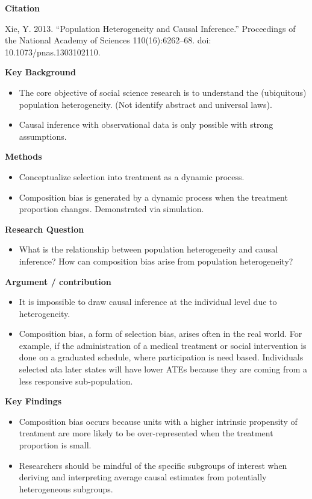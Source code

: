 \documentclass[
]{book}
\providecommand{\tightlist}{%
  \setlength{\itemsep}{0pt}\setlength{\parskip}{0pt}}
\begin{document}
\textbf{Citation}

Xie, Y. 2013. ``Population Heterogeneity and Causal Inference.'' Proceedings of the National Academy of Sciences 110(16):6262--68. doi: 10.1073/pnas.1303102110.

\textbf{Key Background}

\begin{itemize}
\tightlist
\item
  The core objective of social science research is to understand the (ubiquitous) population heterogeneity. (Not identify abstract and universal laws).
\item
  Causal inference with observational data is only possible with strong assumptions.
\end{itemize}

\textbf{Methods}

\begin{itemize}
\tightlist
\item
  Conceptualize selection into treatment as a dynamic process.
\item
  Composition bias is generated by a dynamic process when the treatment proportion changes. Demonstrated via simulation.
\end{itemize}

\textbf{Research Question}

\begin{itemize}
\tightlist
\item
  What is the relationship between population heterogeneity and causal inference? How can composition bias arise from population heterogeneity?
\end{itemize}

\textbf{Argument / contribution}

\begin{itemize}
\tightlist
\item
  It is impossible to draw causal inference at the individual level due to heterogeneity.
\item
  Composition bias, a form of selection bias, arises often in the real world. For example, if the administration of a medical treatment or social intervention is done on a graduated schedule, where participation is need based. Individuals selected ata later states will have lower ATEs because they are coming from a less responsive sub-population.
\end{itemize}

\textbf{Key Findings}

\begin{itemize}
\tightlist
\item
  Composition bias occurs because units with a higher intrinsic propensity of treatment are more likely to be over-represented when the treatment proportion is small.
\item
  Researchers should be mindful of the specific subgroups of interest when deriving and interpreting average causal estimates from potentially heterogeneous subgroups.
\end{itemize}
\end{document}

